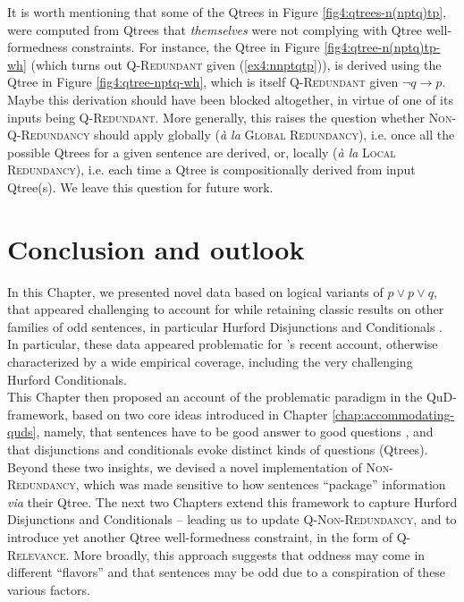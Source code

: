 It is worth mentioning that some of the Qtrees in Figure \ref{fig4:qtrees-n(nptq)tp}, were computed from Qtrees that \textit{themselves} were not complying with Qtree well-formedness constraints. For instance, the Qtree in Figure \ref{fig4:qtree-n(nptq)tp-wh} (which turns out \textsc{Q-Redundant} given (\ref{ex4:nnptqtp})), is derived using the Qtree in Figure \ref{fig4:qtree-nptq-wh}, which is itself \textsc{Q-Redundant} given $\neg q\rightarrow p$. Maybe this derivation should have been blocked altogether, in virtue of one of its inputs being \textsc{Q-Redundant}. More generally, this raises the question whether \textsc{Non-Q-Redundancy} should apply globally (\textit{à la} \textsc{Global Redundancy}), i.e. once all the possible Qtrees for a given sentence are derived, or, locally (\textit{à la} \textsc{Local Redundancy}), i.e. each time a Qtree is compositionally derived from input Qtree(s). We leave this question for future work.



\section{Conclusion and outlook}\label{sec4:conclusion}
In this Chapter, we presented novel data based on logical variants of $p \vee p \vee q$, that appeared challenging to account for while retaining classic results on other families of odd sentences, in particular Hurford Disjunctions and Conditionals \parencite{Hurford1974, Mandelkern2018}. In particular, these data appeared problematic for \citeauthor{Kalomoiros2024}'s recent account, otherwise characterized by a wide empirical coverage, including the very challenging Hurford Conditionals.\\

This Chapter then proposed an account of the problematic paradigm in the QuD-framework, based on two core ideas introduced in Chapter \ref{chap:accommodating-quds}, namely, that sentences have to be good answer to good questions \parencite{Katzir2015}, and that disjunctions and conditionals evoke distinct kinds of questions (Qtrees). Beyond these two insights, we devised a novel implementation of \textsc{Non-Redundancy}, which was made sensitive to how sentences ``package'' information \textit{via} their Qtree. The next two Chapters extend this framework to capture Hurford Disjunctions and Conditionals \parencite{Hurford1974,Mandelkern2018} -- leading us to update \textsc{Q-Non-Redundancy}, and to introduce yet another Qtree well-formedness constraint, in the form of \textsc{Q-Relevance}. More broadly, this approach suggests that oddness may come in different ``flavors'' and that sentences may be odd due to a conspiration of these various factors.\\

